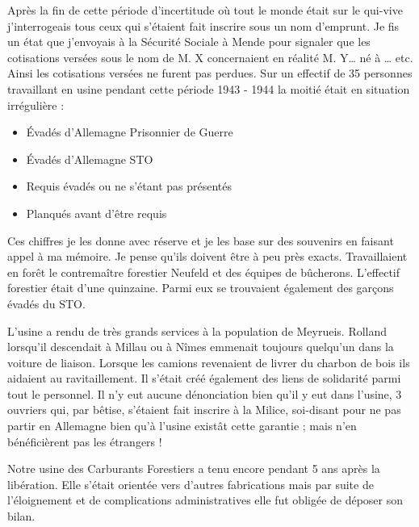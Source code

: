 
Après la fin de cette période d’incertitude où tout le monde était sur le qui-vive j’interrogeais
tous ceux qui s’étaient fait inscrire sous un nom d’emprunt. Je fis un état que j’envoyais à la
Sécurité Sociale à Mende pour signaler que les cotisations versées sous le nom de M. X
concernaient en réalité M. Y… né à … etc. Ainsi les cotisations versées ne furent pas
perdues. Sur un effectif de 35 personnes travaillant en usine pendant cette période 1943 - 1944 la moitié était en situation irrégulière :

\begin{itemize}[leftmargin=3cm, rightmargin=3cm]
\item Évadés d’Allemagne Prisonnier de Guerre 
\item Évadés d’Allemagne STO 
\item Requis évadés ou ne s’étant pas présentés 
\item Planqués avant d’être requis 
\end{itemize}

Ces chiffres je les donne avec réserve et je les base sur des souvenirs en faisant appel à ma
mémoire. Je pense qu’ils doivent être à peu près exacts.
Travaillaient en forêt le contremaître forestier Neufeld et des équipes de bûcherons. L’effectif
forestier était d’une quinzaine. Parmi eux se trouvaient également des garçons évadés du
STO.


L’usine a rendu de très grands services à la population de Meyrueis. Rolland lorsqu’il
descendait à Millau ou à Nîmes emmenait toujours quelqu’un dans la voiture de liaison.
Lorsque les camions revenaient de livrer du charbon de bois ils aidaient au ravitaillement. Il
s’était créé également des liens de solidarité parmi tout le personnel. Il n’y eut aucune
dénonciation bien qu’il y eut dans l’usine, 3 ouvriers qui, par bêtise, s’étaient fait inscrire à la
Milice, soi-disant pour ne pas partir en Allemagne bien qu’à l’usine existât cette garantie ;
mais n’en bénéficièrent pas les étrangers !\\



Notre usine des Carburants Forestiers a tenu encore pendant 5 ans après la libération. Elle
s’était orientée vers d’autres fabrications mais par suite de l’éloignement et de complications
administratives elle fut obligée de déposer son bilan.


